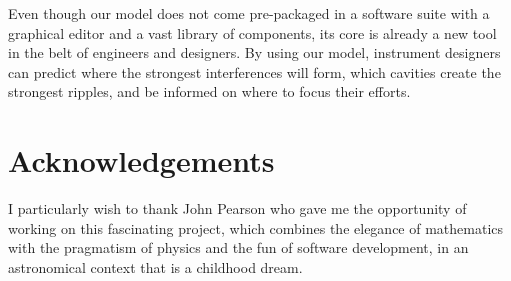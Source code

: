Even though our model does not come pre-packaged in a software suite with a graphical editor and a vast library of components, its core is already a new tool in the belt of engineers and designers.
By using our model, instrument designers can predict where the strongest interferences will form, which cavities create the strongest ripples, and be informed on where to focus their efforts.


\section*{Acknowledgements}
I particularly wish to thank John Pearson who gave me the opportunity of working on this fascinating project, which combines the elegance of mathematics with the pragmatism of physics and the fun of software development, in an astronomical context that is a childhood dream.

